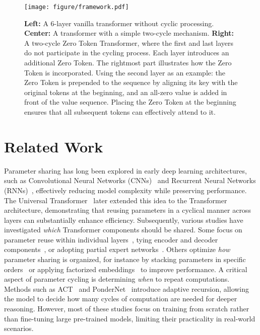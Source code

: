 \begin{figure*}[h]
    \centering
    \texttt{[image: figure/framework.pdf]}
    \vspace{-0.5cm}
    \caption{  
\textbf{Left:} A 6-layer vanilla transformer without cyclic processing.  
\textbf{Center:} A transformer with a simple two-cycle mechanism.  
\textbf{Right:} A two-cycle Zero Token  Transformer, where the first and last layers do not participate in the cycling process. Each layer introduces an additional Zero Token. The rightmost part illustrates how the Zero Token is incorporated. Using the second layer as an example: the Zero Token is prepended to the sequence by aligning its key with the original tokens at the beginning, and an all-zero value is added in front of the value sequence. Placing the Zero Token at the beginning ensures that all subsequent tokens can effectively attend to it.  
}

    \label{fig:your_image}
    \vspace{-0.5cm}
\end{figure*}

\section{Related Work}

Parameter sharing  has long been explored in early deep learning architectures, such as Convolutional Neural Networks (CNNs)~\cite{eigen2013understanding,savarese2019learning} and Recurrent Neural Networks (RNNs)~\cite{graves2016adaptive,sherstinsky2020fundamentals}, effectively reducing model complexity while preserving performance. The Universal Transformer~\cite{dehghani2018universal} later extended this idea to the Transformer architecture, demonstrating that reusing parameters in a cyclical manner across layers can substantially enhance efficiency. Subsequently, various studies have investigated \emph{which} Transformer components should be shared. Some focus on parameter reuse within individual layers~\cite{dabre2019recurrent}, tying encoder and decoder components~\cite{milbauer2023lait,xia2019tied}, or adopting partial expert networks~\cite{liu2024deepseek}. Others optimize \emph{how} parameter sharing is organized, for instance by stacking parameters in specific orders~\cite{takase2021lessons} or applying factorized embeddings~\cite{lan2019albert} to improve performance.
A critical aspect of parameter cycling is determining \emph{when} to repeat computations. Methods such as ACT~\cite{chowdhury2024recurrent,graves2016adaptive,csordas2024moeut,tan2023sparse} and PonderNet~\cite{banino2021pondernet,balagansky2022palbert} introduce adaptive recursion, allowing the model to decide how many cycles of computation are needed for deeper reasoning. However, most of these studies focus on training from scratch rather than fine-tuning large pre-trained models, limiting their practicality in real-world scenarios.

